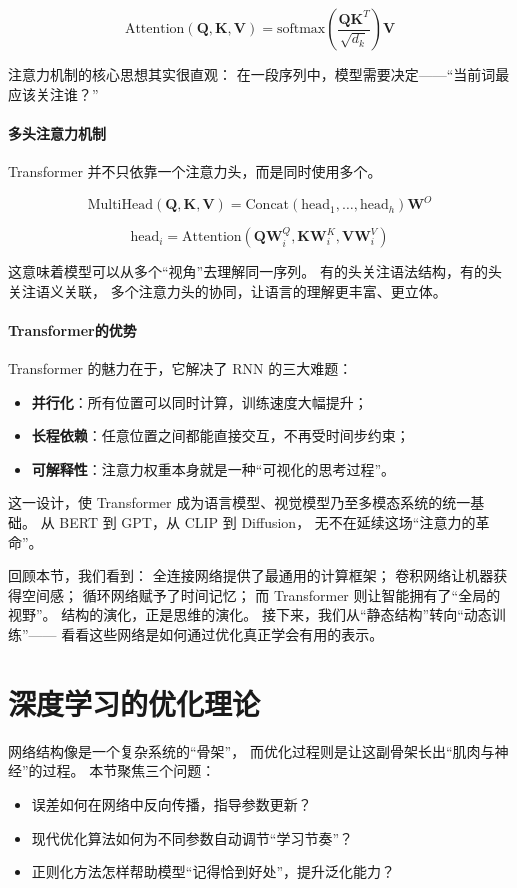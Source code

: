 $$\text{Attention}(\mathbf{Q}, \mathbf{K}, \mathbf{V}) = \text{softmax}\left(\frac{\mathbf{Q}\mathbf{K}^T}{\sqrt{d_k}}\right)\mathbf{V}$$

注意力机制的核心思想其实很直观：  
在一段序列中，模型需要决定——“当前词最应该关注谁？”

\paragraph{多头注意力机制}  
Transformer 并不只依靠一个注意力头，而是同时使用多个。  

$$\text{MultiHead}(\mathbf{Q}, \mathbf{K}, \mathbf{V}) = \text{Concat}(\text{head}_1, \ldots, \text{head}_h)\mathbf{W}^O$$

$$\text{head}_i = \text{Attention}(\mathbf{Q}\mathbf{W}_i^Q, \mathbf{K}\mathbf{W}_i^K, \mathbf{V}\mathbf{W}_i^V)$$

这意味着模型可以从多个“视角”去理解同一序列。  
有的头关注语法结构，有的头关注语义关联，  
多个注意力头的协同，让语言的理解更丰富、更立体。

\paragraph{Transformer的优势}  
Transformer 的魅力在于，它解决了 RNN 的三大难题：

\begin{itemize}
\item \textbf{并行化}：所有位置可以同时计算，训练速度大幅提升；
\item \textbf{长程依赖}：任意位置之间都能直接交互，不再受时间步约束；
\item \textbf{可解释性}：注意力权重本身就是一种“可视化的思考过程”。
\end{itemize}

这一设计，使 Transformer 成为语言模型、视觉模型乃至多模态系统的统一基础。  
从 BERT 到 GPT，从 CLIP 到 Diffusion，  
无不在延续这场“注意力的革命”。

回顾本节，我们看到：  
全连接网络提供了最通用的计算框架；  
卷积网络让机器获得空间感；  
循环网络赋予了时间记忆；  
而 Transformer 则让智能拥有了“全局的视野”。  
结构的演化，正是思维的演化。  
接下来，我们从“静态结构”转向“动态训练”——  
看看这些网络是如何通过优化真正学会有用的表示。

\section{深度学习的优化理论}

网络结构像是一个复杂系统的“骨架”，  
而优化过程则是让这副骨架长出“肌肉与神经”的过程。  
本节聚焦三个问题：  
\begin{itemize}
  \item 误差如何在网络中反向传播，指导参数更新？  
  \item 现代优化算法如何为不同参数自动调节“学习节奏”？  
  \item 正则化方法怎样帮助模型“记得恰到好处”，提升泛化能力？
\end{itemize}

